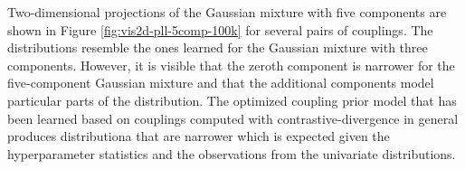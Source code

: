 \documentclass[11pt,a4paper,twoside]{book}
\theoremstyle{definition}
\theoremstyle{definition}
\theoremstyle{remark}
\begin{document}
Two-dimensional projections of the Gaussian mixture with five components
are shown in Figure \ref{fig:vis2d-pll-5comp-100k} for several pairs of
couplings. The distributions resemble the ones learned for the Gaussian
mixture with three components. However, it is visible that the zeroth
component is narrower for the five-component Gaussian mixture and that
the additional components model particular parts of the distribution.
The optimized coupling prior model that has been learned based on
couplings computed with contrastive-divergence in general produces
distributiona that are narrower which is expected given the
hyperparameter statistics and the observations from the univariate
distributions.
\end{document}
